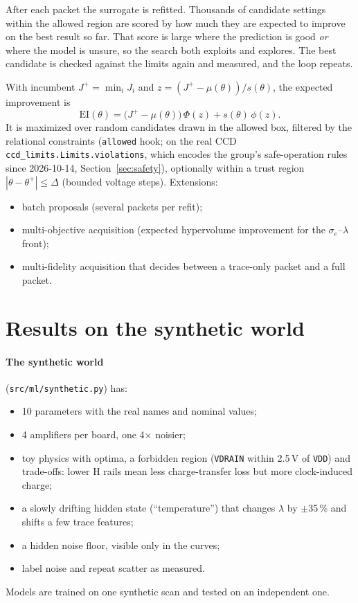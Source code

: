 \documentclass[10pt]{article}
\newcommand{\code}[1]{\texttt{#1}}
\begin{document}
\begin{basic}
After each packet the surrogate is refitted. Thousands of candidate settings within the allowed region are scored by how much they are
expected to improve on the best result so far. That score is large where the prediction is good \emph{or} where the model is unsure, so
the search both exploits and explores. The best candidate is checked against the limits again and measured, and the loop repeats.
\end{basic}
\begin{advanced}
With incumbent $J^+ = \min_i J_i$ and $z = (J^+ - \mu(\theta))/s(\theta)$, the expected improvement is
\begin{equation}
\mathrm{EI}(\theta) = \bigl(J^+ - \mu(\theta)\bigr)\,\Phi(z) + s(\theta)\,\phi(z).
\end{equation}
It is maximized over random candidates drawn in the allowed box, filtered by the relational constraints (\code{allowed} hook; on the real CCD
\code{ccd\_limits.Limits.violations}, which encodes the group's safe-operation rules since 2026-10-14, Section~\ref{sec:safety}), optionally within a trust region $|\theta - \theta^+| \le \Delta$ (bounded voltage steps).
Extensions:
\begin{itemize}
\item batch proposals (several packets per refit);
\item multi-objective acquisition (expected hypervolume improvement for the $\sigma_e$--$\lambda$ front);
\item multi-fidelity acquisition that decides between a trace-only packet and a full packet.
\end{itemize}
\end{advanced}

\section{Results on the synthetic world}
\label{sec:results}

\paragraph{The synthetic world} (\code{src/ml/synthetic.py}) has:
\begin{itemize}
\item 10 parameters with the real names and nominal values;
\item 4 amplifiers per board, one 4$\times$ noisier;
\item toy physics with optima, a forbidden region (\code{VDRAIN} within 2.5\,V of \code{VDD}) and trade-offs: lower H rails mean less
  charge-transfer loss but more clock-induced charge;
\item a slowly drifting hidden state (``temperature'') that changes $\lambda$ by $\pm$35\,\% and shifts a few trace features;
\item a hidden noise floor, visible only in the curves;
\item label noise and repeat scatter as measured.
\end{itemize}
Models are trained on one synthetic scan and tested on an independent one.
\end{document}

